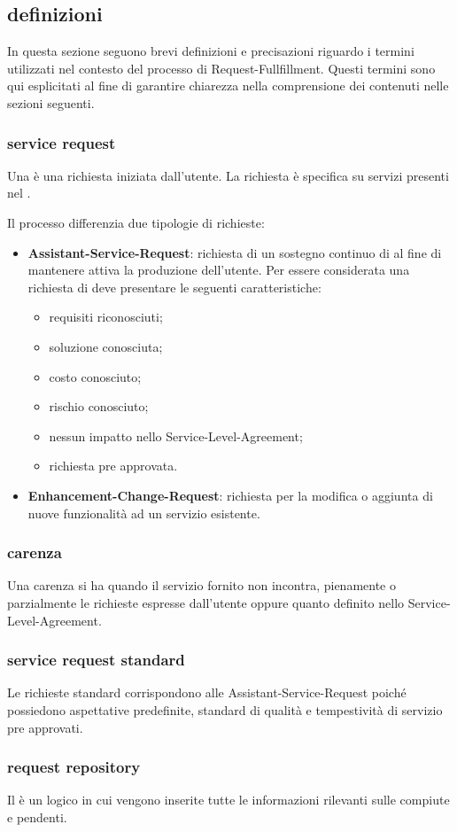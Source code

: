 \subsection[Definizioni]{definizioni}
\label{im-introduction-definitions}
In questa sezione seguono brevi definizioni e precisazioni riguardo i termini utilizzati nel contesto del processo di \ac{Request-Fullfillment}. Questi termini sono qui esplicitati al fine di garantire chiarezza nella comprensione dei contenuti nelle sezioni seguenti.

\subsubsection{service request}
Una  è una richiesta iniziata dall'utente. La richiesta è specifica su servizi presenti nel .

Il processo differenzia due tipologie di richieste:

\begin{itemize}
\item{\textbf{\ac{Assistant-Service-Request}}: richiesta di un sostegno continuo di  al fine di mantenere attiva la produzione dell'utente. Per essere considerata una richiesta di  deve presentare le seguenti caratteristiche:}
\begin{itemize}
\item{requisiti riconosciuti;}
\item{soluzione conosciuta;}
\item{costo conosciuto;}
\item{rischio conosciuto;}
\item{nessun impatto nello \ac{Service-Level-Agreement};}
\item{richiesta pre approvata.}
\end{itemize}
\item{\textbf{\ac{Enhancement-Change-Request}}: richiesta per la modifica o aggiunta di nuove funzionalità ad un servizio esistente.}
\end{itemize}

\subsubsection{carenza}
Una carenza si ha quando il servizio fornito non incontra, pienamente o parzialmente le richieste espresse dall'utente oppure quanto definito nello \ac{Service-Level-Agreement}.

\subsubsection{service request standard}
Le richieste standard corrispondono alle \ac{Assistant-Service-Request} poiché possiedono aspettative predefinite, standard di qualità e tempestività di servizio pre approvati.

\subsubsection{request repository}
Il  è un  logico in cui vengono inserite tutte le informazioni rilevanti sulle  compiute e pendenti.

